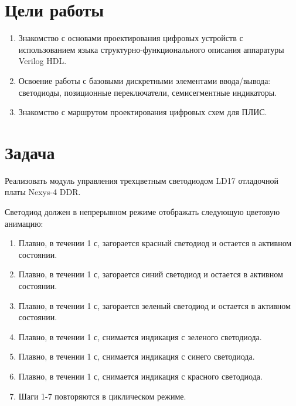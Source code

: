 
\usepackage{hyperref}
\hypersetup{pdftex,colorlinks=true,allcolors=black}
\usepackage{hypcap}
\usepackage{graphicx}
\fancyhead[LR]{}

\def \labnum {1}
\def \labsubj {Схемотехника ЭВМ}
\def \labauthor {Айтуганов Д. А. \\ Чебыкин И. Б.}
\def \labgroup {P3301}
\def \labinsp {Баевских А. Н.}
\def \labname {Вариант: 2}

\isnametrue
\lstset{  
	caption=\lstname,
	basicstyle=\ttfamily\selectfont\scriptsize
}



\tableofcontents
\newpage
\section{Цели работы}
\begin{enumerate}
\item Знакомство с основами проектирования цифровых устройств с использованием языка
структурно-функционального описания аппаратуры Verilog HDL.
\item Освоение работы с базовыми дискретными элементами ввода/вывода: светодиоды,
позиционные переключатели, семисегментные индикаторы.
\item Знакомство с маршрутом проектирования цифровых схем для ПЛИС.
\end{enumerate}

\section{Задача}
Реализовать модуль управления трехцветным светодиодом LD17 отладочной платы Nexys-4 DDR.

Светодиод должен в непрерывном режиме отображать следующую цветовую
анимацию:
\begin{enumerate}
\item Плавно, в течении 1 с, загорается красный светодиод и остается в активном
состоянии.
\item Плавно, в течении 1 с, загорается синий светодиод и остается в активном
состоянии.
\item Плавно, в течении 1 с, загорается зеленый светодиод и остается в активном
состоянии.
\item Плавно, в течении 1 с, снимается индикация с зеленого светодиода.
\item Плавно, в течении 1 с, снимается индикация с синего светодиода.
\item Плавно, в течении 1 с, снимается индикация с красного светодиода.
\item Шаги 1-7 повторяются в циклическом режиме.
\end{enumerate}

